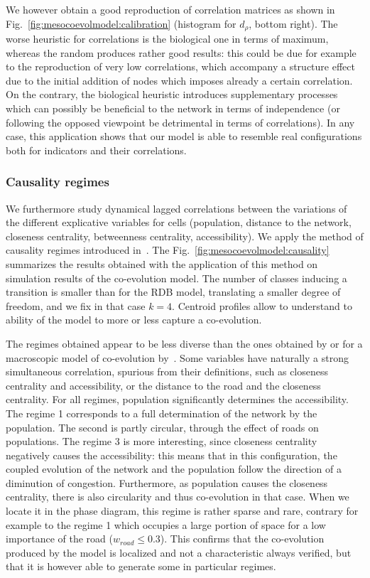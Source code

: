 \documentclass[11pt]{article}
\begin{document}
We however obtain a good reproduction of correlation matrices as shown in Fig.~\ref{fig:mesocoevolmodel:calibration} (histogram for $d_{\rho}$, bottom right). The worse heuristic for correlations is the biological one in terms of maximum, whereas the random produces rather good results: this could be due for example to the reproduction of very low correlations, which accompany a structure effect due to the initial addition of nodes which imposes already a certain correlation. On the contrary, the biological heuristic introduces supplementary processes which can possibly be beneficial to the network in terms of independence (or following the opposed viewpoint be detrimental in terms of correlations). In any case, this application shows that our model is able to resemble real configurations both for indicators and their correlations.



\subsubsection{Causality regimes}


We furthermore study dynamical lagged correlations between the variations of the different explicative variables for cells (population, distance to the network, closeness centrality, betweenness centrality, accessibility). We apply the method of causality regimes introduced in~\cite{raimbault2017identification}. The Fig.~\ref{fig:mesocoevolmodel:causality} summarizes the results obtained with the application of this method on simulation results of the co-evolution model. The number of classes inducing a transition is smaller than for the RDB model, translating a smaller degree of freedom, and we fix in that case $k=4$. Centroid profiles allow to understand to ability of the model to more or less capture a co-evolution.



The regimes obtained appear to be less diverse than the ones obtained by \cite{raimbault2017identification} or for a macroscopic model of co-evolution by~\cite{2018arXiv180409430R}. Some variables have naturally a strong simultaneous correlation, spurious from their definitions, such as closeness centrality and accessibility, or the distance to the road and the closeness centrality. For all regimes, population significantly determines the accessibility. The regime 1 corresponds to a full determination of the network by the population. The second is partly circular, through the effect of roads on populations. The regime 3 is more interesting, since closeness centrality negatively causes the accessibility: this means that in this configuration, the coupled evolution of the network and the population follow the direction of a diminution of congestion. Furthermore, as population causes the closeness centrality, there is also circularity and thus co-evolution in that case. When we locate it in the phase diagram, this regime is rather sparse and rare, contrary for example to the regime 1 which occupies a large portion of space for a low importance of the road ($w_{road} \leq 0.3$). This confirms that the co-evolution produced by the model is localized and not a characteristic always verified, but that it is however able to generate some in particular regimes.
\end{document}

